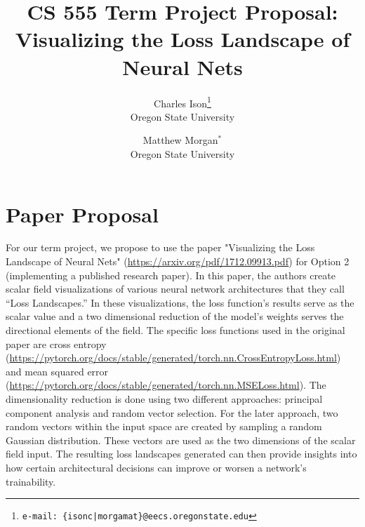 \documentclass{acmsiggraph}
\title{CS 555 Term Project Proposal: Visualizing the Loss Landscape of Neural Nets}
\author{Charles Ison\thanks{\small\texttt{e-mail: \{isonc|morgamat\}@eecs.oregonstate.edu}}\\ Oregon State University
\and Matthew Morgan$^{\ast}$ \\
Oregon State University}
\begin{document}

\maketitle
\keywordlist

\section{Paper Proposal}
\label{sec:intro}

For our term project, we propose to use the paper "Visualizing the Loss Landscape of Neural Nets" (\url{https://arxiv.org/pdf/1712.09913.pdf}) for Option 2 (implementing a published research paper). In this paper, the authors create scalar field visualizations of various neural network architectures that they call “Loss Landscapes.” In these visualizations, the loss function’s results serve as the scalar value and a two dimensional reduction of the model’s weights serves the directional elements of the field. The specific loss functions used in the original paper are cross entropy (\url{https://pytorch.org/docs/stable/generated/torch.nn.CrossEntropyLoss.html}) and mean squared error (\url{https://pytorch.org/docs/stable/generated/torch.nn.MSELoss.html}).
The dimensionality reduction is done using two different approaches: principal component analysis and random vector selection. For the later approach, two random vectors within the input space are created by sampling a random Gaussian distribution. These vectors are used as the two dimensions of the scalar field input. The resulting loss landscapes generated can then provide insights into how certain architectural decisions can improve or worsen a network's trainability.
\end{document}
